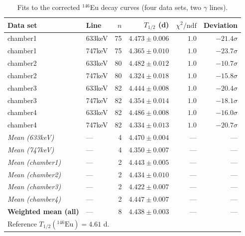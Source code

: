 \begin{table}[htbp]
  \centering
  \caption{Fits to the corrected $^{146}$Eu decay curves (four data sets, two $\gamma$ lines).}
  \label{tab:eu146-lnfit}
  \begin{tabular}{llrrrr}
    \hline
    Data set & Line & $n$ & $T_{1/2}$ (d) & $\chi^2/\mathrm{ndf}$ & Deviation \\
    \hline
    chamber1 & 633keV & 75 & $4.473 \pm 0.006$ & $1.0$ & $-21.4\sigma$ \\
    chamber1 & 747keV & 75 & $4.365 \pm 0.010$ & $1.0$ & $-23.7\sigma$ \\
    chamber2 & 633keV & 80 & $4.482 \pm 0.012$ & $1.0$ & $-10.7\sigma$ \\
    chamber2 & 747keV & 80 & $4.324 \pm 0.018$ & $1.0$ & $-15.8\sigma$ \\
    chamber3 & 633keV & 82 & $4.444 \pm 0.008$ & $1.0$ & $-20.4\sigma$ \\
    chamber3 & 747keV & 82 & $4.354 \pm 0.014$ & $1.0$ & $-18.1\sigma$ \\
    chamber4 & 633keV & 82 & $4.486 \pm 0.008$ & $1.0$ & $-16.0\sigma$ \\
    chamber4 & 747keV & 82 & $4.334 \pm 0.013$ & $1.0$ & $-20.7\sigma$ \\
    \hline
    \textit{Mean (633keV)} & --- & 4 & $4.470 \pm 0.004$ & --- & --- \\
    \textit{Mean (747keV)} & --- & 4 & $4.350 \pm 0.007$ & --- & --- \\
    \textit{Mean (chamber1)} & --- & 2 & $4.443 \pm 0.005$ & --- & --- \\
    \textit{Mean (chamber2)} & --- & 2 & $4.434 \pm 0.010$ & --- & --- \\
    \textit{Mean (chamber3)} & --- & 2 & $4.422 \pm 0.007$ & --- & --- \\
    \textit{Mean (chamber4)} & --- & 2 & $4.447 \pm 0.007$ & --- & --- \\
    \hline
    \textbf{Weighted mean (all)} & --- & 8 & $\mathbf{4.438 \pm 0.003}$ & --- & --- \\
    \hline
    \multicolumn{6}{l}{\footnotesize Reference $T_{1/2}(^{146}\mathrm{Eu}) = 4.61$ d.} \\
    \hline
  \end{tabular}
\end{table}
